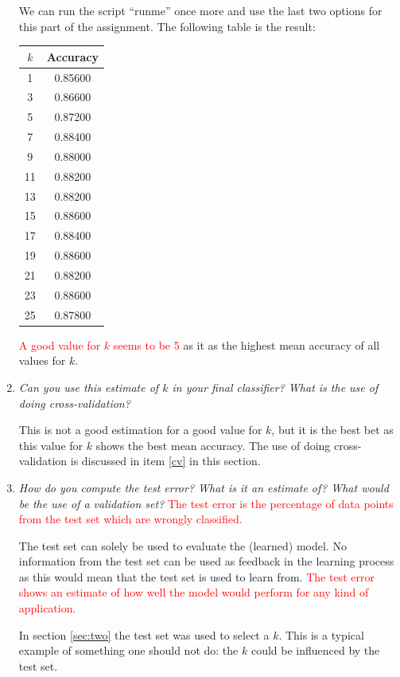 \documentclass[a4paper,11pt]{article}
\newcommand{\highlightColor}{red}
\begin{document}
\begin{enumerate}
We can run the script ``runme'' once more and use the last two options for 
this part of the assignment.  The following table is the result:

\begin{tabular}{c | c}
\textbf{$k$} & \textbf{Accuracy} \\
\hline
1 &  0.85600\\ 
3 &  0.86600\\ 
5 &  0.87200\\ 
7 &  0.88400\\ 
9 &  0.88000\\ 
11&  0.88200\\ 
13&  0.88200\\ 
15&  0.88600\\ 
17&  0.88400\\ 
19&  0.88600\\ 
21&  0.88200\\ 
23&  0.88600\\ 
25&  0.87800\\ 
\end{tabular}

\textcolor{\highlightColor}{A good value for $k$ seems to be 5} as it as the highest mean accuracy of all
values for $k$. 

\item \textit{Can you use this estimate of $k$ in your final classifier? What is the use of doing cross-validation?}

This is not a good estimation for a good value for $k$, but it is the best 
bet as this value for $k$ shows the best mean accuracy. The use of doing 
cross-validation is discussed in item \ref{cv} in this section.

\item \textit{ How do you compute the test error? What is it an estimate of? What would be the use of a validation
set? }
\textcolor{\highlightColor}{The test error is the percentage of data points from the test set which 
are wrongly classified.}

The test set can solely be used to evaluate the (learned) model. No
information from the test set can be used as feedback in the learning 
process as this would mean that the test set is used to learn from. 
\textcolor{\highlightColor}{The 
test error shows an estimate of how well the model would perform for
any kind of application.}

In section \ref{sec:two} the test set was used to select a $k$. This is a
typical example of something one should not do: the $k$ could be influenced
by the test set. 


\end{enumerate}
\end{document}
